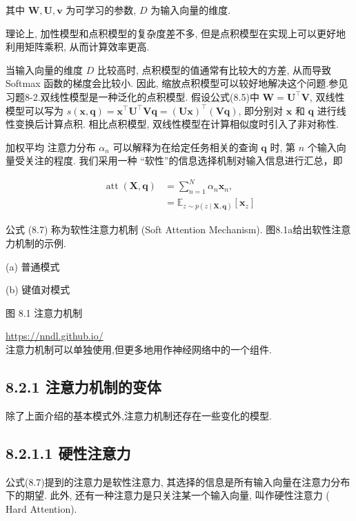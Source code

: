\documentclass[10pt]{article}
\begin{document}
其中 $\boldsymbol{W}, \boldsymbol{U}, \boldsymbol{v}$ 为可学习的参数, $D$ 为输入向量的维度.

理论上, 加性模型和点积模型的复杂度差不多, 但是点积模型在实现上可以更好地利用矩阵乘积, 从而计算效率更高.

当输入向量的维度 $D$ 比较高时, 点积模型的值通常有比较大的方差, 从而导致 Softmax 函数的梯度会比较小. 因此, 缩放点积模型可以较好地解决这个问题.参见习题8-2.双线性模型是一种泛化的点积模型. 假设公式(8.5)中 $\boldsymbol{W}=\boldsymbol{U}^{\top} \boldsymbol{V}$, 双线性模型可以写为 $s(\boldsymbol{x}, \boldsymbol{q})=\boldsymbol{x}^{\top} \boldsymbol{U}^{\top} \boldsymbol{V} \boldsymbol{q}=(\boldsymbol{U} \boldsymbol{x})^{\top}(\boldsymbol{V q})$, 即分别对 $\boldsymbol{x}$ 和 $\boldsymbol{q}$ 进行线性变换后计算点积. 相比点积模型, 双线性模型在计算相似度时引入了非对称性.

加权平均 注意力分布 $\alpha_{n}$ 可以解释为在给定任务相关的查询 $\boldsymbol{q}$ 时, 第 $n$ 个输入向量受关注的程度. 我们采用一种 “软性”的信息选择机制对输入信息进行汇总，即


\begin{align*}
\operatorname{att}(\boldsymbol{X}, \boldsymbol{q}) & =\sum_{n=1}^{N} \alpha_{n} \boldsymbol{x}_{n},  \tag{8.6}\\
& =\mathbb{E}_{z \sim p(z \mid \boldsymbol{X}, \boldsymbol{q})}\left[\boldsymbol{x}_{z}\right] \tag{8.7}
\end{align*}


公式 (8.7) 称为软性注意力机制 (Soft Attention Mechanism). 图8.1a给出软性注意力机制的示例.



(a) 普通模式



(b) 键值对模式

图 8.1 注意力机制

\href{https://nndl.github.io/}{https://nndl.github.io/}\\
注意力机制可以单独使用,但更多地用作神经网络中的一个组件.

\subsection*{8.2.1 注意力机制的变体}
除了上面介绍的基本模式外,注意力机制还存在一些变化的模型.

\subsection*{8.2.1.1 硬性注意力}
公式(8.7)提到的注意力是软性注意力, 其选择的信息是所有输入向量在注意力分布下的期望. 此外, 还有一种注意力是只关注某一个输入向量, 叫作硬性注意力 ( Hard Attention).
\end{document}
